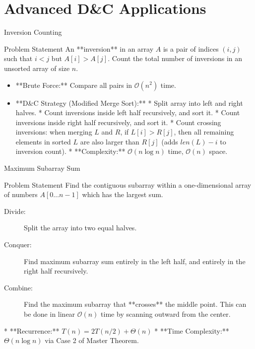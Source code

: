 \documentclass[aspectratio=169,xcolor=dvipsnames]{beamer}
\begin{document}
\section{Advanced D\&C Applications}

\begin{frame}{Inversion Counting}
  \begin{block}{Problem Statement}
    An **inversion** in an array $A$ is a pair of indices $(i, j)$ such that $i < j$ but $A[i] > A[j]$.
    Count the total number of inversions in an unsorted array of size $n$.
  \end{block}
  \begin{itemize}
    \item **Brute Force:** Compare all pairs in $\mathcal{O}(n^2)$ time.
    \item **D\&C Strategy (Modified Merge Sort):**
      * Split array into left and right halves.
      * Count inversions inside left half recursively, and sort it.
      * Count inversions inside right half recursively, and sort it.
      * Count crossing inversions: when merging $L$ and $R$, if $L[i] > R[j]$, then all remaining elements in sorted $L$ are also larger than $R[j]$ (adds $len(L) - i$ to inversion count).
      * **Complexity:** $\mathcal{O}(n \log n)$ time, $\mathcal{O}(n)$ space.
  \end{itemize}
\end{frame}

\begin{frame}{Maximum Subarray Sum}
  \begin{block}{Problem Statement}
    Find the contiguous subarray within a one-dimensional array of numbers $A[0 \ldots n-1]$ which has the largest sum.
  \end{block}
  \begin{description}
    \item[Divide:] Split the array into two equal halves.
    \item[Conquer:] Find maximum subarray sum entirely in the left half, and entirely in the right half recursively.
    \item[Combine:] Find the maximum subarray that **crosses** the middle point. This can be done in linear $\mathcal{O}(n)$ time by scanning outward from the center.
  \end{description}
  * **Recurrence:** $T(n) = 2T(n/2) + \Theta(n)$
  * **Time Complexity:** $\Theta(n \log n)$ via Case 2 of Master Theorem.
\end{frame}
\end{document}
